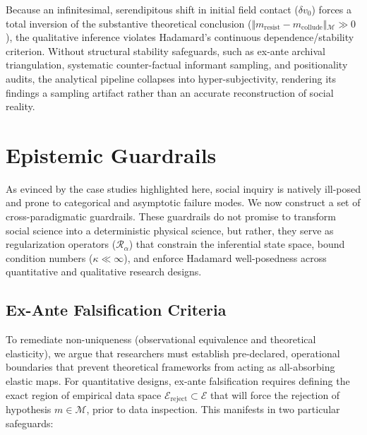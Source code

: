 \documentclass{article}
\theoremstyle{definition}
\begin{document}
\noindent
Because an infinitesimal, serendipitous shift in initial field contact ($\delta v_0$) forces a total inversion of the substantive theoretical conclusion ($\Vert{}m_{\text{resist}} - m_{\text{collude}}\Vert{}_\mathcal{M} \gg 0$), the qualitative inference violates Hadamard's continuous dependence/stability criterion. Without structural stability safeguards, such as ex-ante archival triangulation, systematic counter-factual informant sampling, and positionality audits, the analytical pipeline collapses into hyper-subjectivity, rendering its findings a sampling artifact rather than an accurate reconstruction of social reality.

\section{Epistemic Guardrails}

As evinced by the case studies highlighted here, social inquiry is natively ill-posed and prone to categorical and asymptotic failure modes. We now construct a set of cross-paradigmatic guardrails. These guardrails do not promise to transform social science into a deterministic physical science, but rather, they serve as regularization operators ($\mathcal{R}_\alpha$) that constrain the inferential state space, bound condition numbers ($\kappa \ll \infty$), and enforce Hadamard well-posedness across quantitative and qualitative research designs.

\subsection{Ex-Ante Falsification Criteria}

To remediate non-uniqueness (observational equivalence and theoretical elasticity), we argue that researchers must establish pre-declared, operational boundaries that prevent theoretical frameworks from acting as all-absorbing elastic maps. For quantitative designs, ex-ante falsification requires defining the exact region of empirical data space $\mathcal{E}_{\text{reject}} \subset \mathcal{E}$ that will force the rejection of hypothesis $m \in \mathcal{M}$, prior to data inspection. This manifests in two particular safeguards:
\end{document}
